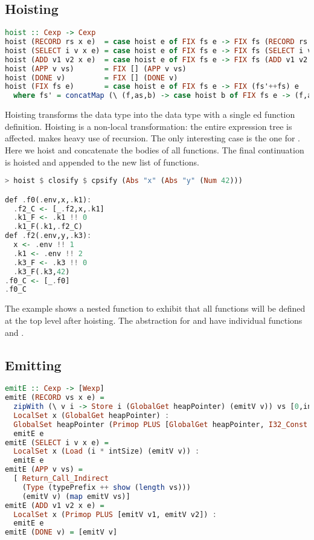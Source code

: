 {\subsection{\label{subsection:hoist}Hoisting}
\begin{lstlisting}[language=Haskell]
hoist :: Cexp -> Cexp
hoist (RECORD rs x e)  = case hoist e of FIX fs e -> FIX fs (RECORD rs x e)
hoist (SELECT i v x e) = case hoist e of FIX fs e -> FIX fs (SELECT i v x e)
hoist (ADD v1 v2 x e)  = case hoist e of FIX fs e -> FIX fs (ADD v1 v2 x e)
hoist (APP v vs)       = FIX [] (APP v vs)
hoist (DONE v)         = FIX [] (DONE v)               
hoist (FIX fs e)       = case hoist e of FIX fs e -> FIX (fs'++fs) e
  where fs' = concatMap (\ (f,as,b) -> case hoist b of FIX fs e -> (f,as,e) : fs) fs
\end{lstlisting}

Hoisting transforms the  data type into the  data type with a single ed function definition. Hoisting is a non-local transformation: the entire expression tree is affected.  makes heavy use of recursion. The only interesting case is the one for . Here we hoist and concatenate the bodies of all functions. The final continuation  is hoisted and appended to the new list of functions.

\begin{lstlisting}[language=Haskell]
> hoist $ closify $ cpsify (Abs "x" (Abs "y" (Num 42)))

def .f0(.env,x,.k1):
  .f2_C <- [_.f2,x,.k1]
  .k1_F <- .k1 !! 0
  .k1_F(.k1,.f2_C)
def .f2(.env,y,.k3):
  x <- .env !! 1
  .k1 <- .env !! 2
  .k3_F <- .k3 !! 0
  .k3_F(.k3,42)
.f0_C <- [_.f0]
.f0_C
\end{lstlisting}

The example shows a nested function to exhibit that all functions will be defined at the top level after hoisting. The abstraction for  and  have individual functions  and .

\subsection{\label{section:emit}Emitting}
\begin{lstlisting}[language=Haskell]
emitE :: Cexp -> [Wexp]
emitE (RECORD vs x e) =
  zipWith (\ v i -> Store i (GlobalGet heapPointer) (emitV v)) vs [0,intSize..] ++
  LocalSet x (GlobalGet heapPointer) :
  GlobalSet heapPointer (Primop PLUS [GlobalGet heapPointer, I32_Const (length vs * intSize)]) :
  emitE e
emitE (SELECT i v x e) =
  LocalSet x (Load (i * intSize) (emitV v)) :
  emitE e
emitE (APP v vs) =
  [ Return_Call_Indirect
    (Type (typePrefix ++ show (length vs)))
    (emitV v) (map emitV vs)]
emitE (ADD v1 v2 x e) =
  LocalSet x (Primop PLUS [emitV v1, emitV v2]) :
  emitE e
emitE (DONE v) = [emitV v]


\end{lstlisting}}
